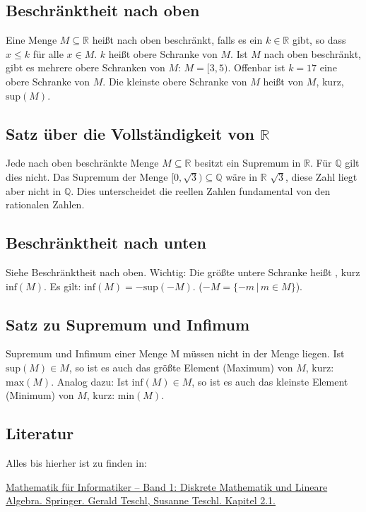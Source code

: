 \subsection{Beschränktheit nach oben}
Eine Menge $M \subseteq \mathbb{R}$ heißt nach oben beschränkt, falls es ein $k \in \mathbb{R}$ gibt, so dass $x \le k$ für alle $x \in M$. $k$ heißt obere Schranke von $M$. Ist $M$ nach oben beschränkt, gibt es mehrere obere Schranken von $M$: $M = [3,5)$. Offenbar ist $k = 17$ eine obere Schranke von $M$. Die kleinste obere Schranke von $M$ heißt  von $M$, kurz, $\text{sup}(M)$.

\subsection{Satz über die Vollständigkeit von $\mathbb{R}$}
Jede nach oben beschränkte Menge $M \subseteq \mathbb{R}$ besitzt ein Supremum in $\mathbb{R}$. Für $\mathbb{Q}$ gilt dies nicht. Das Supremum der Menge $[0,\sqrt{3}) \subseteq \mathbb{Q}$ wäre in $\mathbb{R}$ $\sqrt{3}$, diese Zahl liegt aber nicht in $\mathbb{Q}$. Dies unterscheidet die reellen Zahlen fundamental von den rationalen Zahlen.

\subsection{Beschränktheit nach unten}
Siehe Beschränktheit nach oben. Wichtig: Die größte untere Schranke heißt , kurz $\text{inf}(M)$. Es gilt: $\text{inf}(M) = -\text{sup}(-M)$. ($-M = \{-m\,|\,m \in M\}$).

\subsection{Satz zu Supremum und Infimum} Supremum und Infimum einer Menge M müssen nicht in der Menge liegen. Ist $\text{sup}(M) \in M$, so ist es auch das größte Element (Maximum) von $M$, kurz: $\text{max}(M)$. Analog dazu: Ist $\text{inf}(M) \in M$, so ist es auch das kleinste Element (Minimum) von $M$, kurz: $\text{min}(M)$.

\subsection{Literatur}
Alles bis hierher ist zu finden in:

\href{http://www.mat.univie.ac.at/~gerald/ftp/book-mfi/mfi1.pdf}{Mathematik für Informatiker -- Band 1: Diskrete Mathematik und Lineare Algebra. Springer. Gerald Teschl, Susanne Teschl. Kapitel 2.1.}

